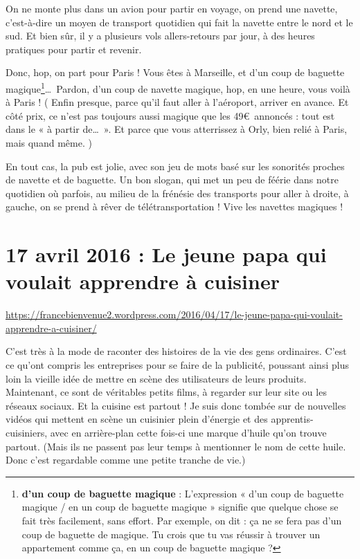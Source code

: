 \documentclass[11pt, french]{report}
\begin{document}
On ne monte plus dans un avion pour partir en voyage, on prend une navette,
c’est-à-dire un moyen de transport quotidien qui fait la navette entre le nord
et le sud. Et bien sûr, il y a plusieurs vols allers-retours par jour, à des
heures pratiques pour partir et revenir.

Donc, hop, on part pour Paris ! Vous êtes à Marseille, et d’un coup de baguette
magique\footnote{\textbf{d’un coup de baguette magique} : L’expression
  « d’un coup de baguette magique / en un coup de baguette magique » signifie
  que quelque chose se fait très facilement, sans effort.
  Par exemple, on dit : ça ne se fera pas d’un coup de baguette de magique.
  Tu crois que tu vas réussir à trouver un appartement comme ça, en un coup de
  baguette magique ? }\ldots\ Pardon, d’un coup de navette magique, hop, en
une heure, vous voilà à Paris ! ( Enfin presque, parce qu’il faut aller à
l’aéroport, arriver en avance. Et côté prix, ce n’est pas toujours aussi
magique que les 49\euro\ annoncés : tout est dans le « à partir de\ldots\ ». Et
parce que vous atterrissez à Orly, bien relié à Paris, mais quand même. )

En tout cas, la pub est jolie, avec son jeu de mots basé sur les sonorités
proches de navette et de baguette. Un bon slogan, qui met un peu de féérie dans
notre quotidien où parfois, au milieu de la frénésie des transports pour aller
à droite, à gauche, on se prend à rêver de télétransportation ! Vive les
navettes magiques ! 

\vfill

\chapter{17 avril 2016 : Le jeune papa qui voulait apprendre à cuisiner}

\url{https://francebienvenue2.wordpress.com/2016/04/17/le-jeune-papa-qui-voulait-apprendre-a-cuisiner/}

\vfill

C’est très à la mode de raconter des histoires de la vie des gens ordinaires.
C’est ce qu’ont compris les entreprises pour se faire de la publicité, poussant
ainsi plus loin la vieille idée de mettre en scène des utilisateurs de leurs
produits. Maintenant, ce sont de véritables petits films, à regarder sur leur
site ou les réseaux sociaux. Et la cuisine est partout ! Je suis donc tombée sur
de nouvelles vidéos qui mettent en scène un cuisinier plein d’énergie et des
apprentis-cuisiniers, avec en arrière-plan cette fois-ci une marque d’huile
qu’on trouve partout. (Mais ils ne passent pas leur temps à mentionner le nom
de cette huile. Donc c’est regardable comme une petite tranche de vie.)
\end{document}
